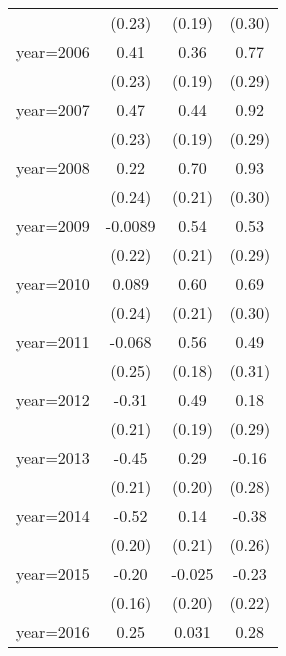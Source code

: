 \begin{sidewaystable}[htbp]
\begin{tabular}{l*{3}{c}}
                &   (0.23)         &   (0.19)         &   (0.30)         \\
\addlinespace
year=2006       &     0.41\sym{*}  &     0.36\sym{*}  &     0.77\sym{**} \\
                &   (0.23)         &   (0.19)         &   (0.29)         \\
\addlinespace
year=2007       &     0.47\sym{**} &     0.44\sym{**} &     0.92\sym{***}\\
                &   (0.23)         &   (0.19)         &   (0.29)         \\
\addlinespace
year=2008       &     0.22         &     0.70\sym{***}&     0.93\sym{***}\\
                &   (0.24)         &   (0.21)         &   (0.30)         \\
\addlinespace
year=2009       &  -0.0089         &     0.54\sym{**} &     0.53\sym{*}  \\
                &   (0.22)         &   (0.21)         &   (0.29)         \\
\addlinespace
year=2010       &    0.089         &     0.60\sym{***}&     0.69\sym{**} \\
                &   (0.24)         &   (0.21)         &   (0.30)         \\
\addlinespace
year=2011       &   -0.068         &     0.56\sym{***}&     0.49         \\
                &   (0.25)         &   (0.18)         &   (0.31)         \\
\addlinespace
year=2012       &    -0.31         &     0.49\sym{**} &     0.18         \\
                &   (0.21)         &   (0.19)         &   (0.29)         \\
\addlinespace
year=2013       &    -0.45\sym{**} &     0.29         &    -0.16         \\
                &   (0.21)         &   (0.20)         &   (0.28)         \\
\addlinespace
year=2014       &    -0.52\sym{**} &     0.14         &    -0.38         \\
                &   (0.20)         &   (0.21)         &   (0.26)         \\
\addlinespace
year=2015       &    -0.20         &   -0.025         &    -0.23         \\
                &   (0.16)         &   (0.20)         &   (0.22)         \\
\addlinespace
year=2016       &     0.25\sym{***}&    0.031         &     0.28\sym{*}  \\

\end{tabular}
\end{sidewaystable}
